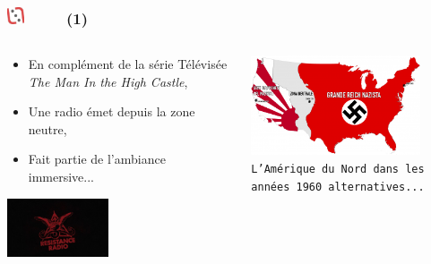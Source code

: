 \documentclass[slidetop,11pt]{beamer}
\def\moreInFrameTitleLeftt{\includegraphics[height=0.5cm]{img/ligueludique-0.png}~~~~~}
\begin{document}
\subsubsection{\sectionPartIIaVIII}
\begin{frame}
	\frametitle{\moreInFrameTitleLeftt \sectionPartIIaVIII  (1) }
	\begin{columns}[T]
		\begin{column}[T]{5.05cm}
			\begin{itemize}
				\item En compl{\'e}ment de la s{\'e}rie T{\'e}l{\'e}vis{\'e}e \emph{The Man In the High Castle}, 
				\item Une radio {\'e}met depuis la zone neutre,  
				\item Fait partie de l'ambiance immersive...
			\end{itemize}
			
			\includegraphics[width=3.00cm]{img/ResistanceRadio/resistance-radio-700x401.jpg}~\\
			
		\end{column}
		\begin{column}[T]{5.05cm}
			\includegraphics[width=5.00cm]{img/ResistanceRadio/USA_in_The_Man_in_the_High_Castle-640x377}~\\
			\texttt{L'Am{\'e}rique du Nord dans les ann{\'e}es 1960 alternatives...}
		\end{column}
	\end{columns}
\end{frame} 
\end{document}
